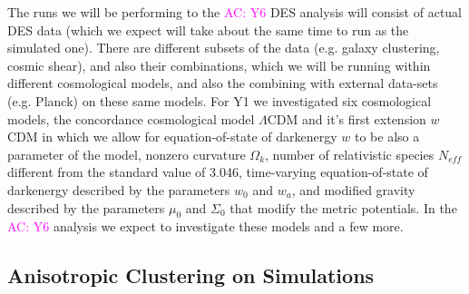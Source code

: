 \documentclass[12pt]{article}
\newcommand{\acampos}[1]{\textcolor{magenta}{AC: #1}}
\begin{document}
\begin{small}
The runs we will be performing to the \acampos{Y6} DES analysis will consist of actual DES data (which we expect will take about the same time to run as the simulated one). There are different subsets of the data (e.g. galaxy clustering, cosmic shear), and also their combinations, which we will be running within different cosmological models, and also the combining with external data-sets (e.g. Planck) on these same models. For Y1 we investigated six cosmological models, the concordance cosmological model $\Lambda$CDM and it's first extension $w$CDM in which we allow for equation-of-state of darkenergy $w$ to be also a parameter of the model, nonzero curvature $\Omega_k$,  number of relativistic species $N_{eff}$ different from the standard value of 3.046, time-varying equation-of-state of darkenergy described by the parameters $w_0$ and $w_a$, and modified gravity described by the parameters $\mu_0$ and $\Sigma_0$ that modify the metric potentials. In the \acampos{Y6} analysis we expect to investigate these models and a few more.



\subsection{Anisotropic Clustering on Simulations}

\end{small}
\end{document}
